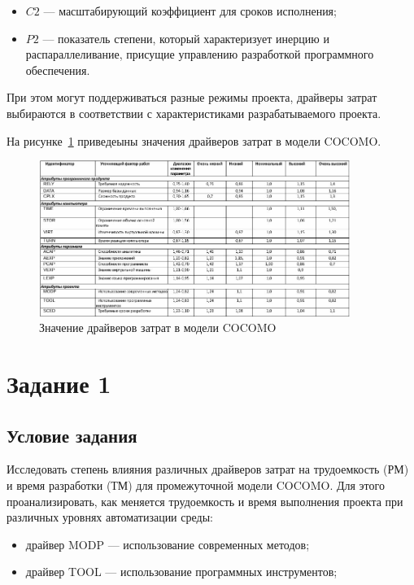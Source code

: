 \begin{itemize}
	\item $C2$ --- масштабирующий коэффициент для сроков исполнения;
	\item $P2$ --- показатель степени, который характеризует инерцию и распараллеливание, присущие управлению разработкой программного обеспечения.
\end{itemize}

При этом могут поддерживаться разные режимы проекта, драйверы затрат выбираются в соответствии с характеристиками разрабатываемого проекта.

На рисунке~\ref{fig:screen1} приведеыны значения драйверов затрат в модели COCOMO.

\begin{figure}[H]
	\centering
	\includegraphics[width=0.9\textwidth]{img/screen1.jpg}
	\caption{Значение драйверов затрат в модели COCOMO}
	\label{fig:screen1}
\end{figure}

\section{Задание 1}

\subsection{Условие задания}

Исследовать степень влияния различных драйверов затрат на трудоемкость (РМ) и время разработки (ТМ) для промежуточной модели COCOMO. Для этого проанализировать, как меняется трудоемкость и время выполнения проекта при различных уровнях автоматизации среды:

\begin{itemize}
	\item драйвер MODP --- использование современных методов;
	\item драйвер TOOL --- использование программных инструментов;
\end{itemize}

